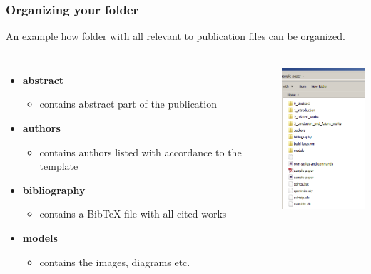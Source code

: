 \begin{frame}  \frametitle{Organizing your folder}
	
	An example how folder with all relevant to publication files can be organized.
	
	\begin{columns}
		\begin{itemize}
			\item \textbf{abstract}
				\begin{itemize}
					\item contains abstract part of the publication
				\end{itemize}
			\item \textbf{authors}
				\begin{itemize}
					\item contains authors listed with accordance to the template
				\end{itemize}					
			\item \textbf{bibliography}
			\begin{itemize}
				\item contains a BibTeX file with all cited works
			\end{itemize}					
			\item \textbf{models}
			\begin{itemize}					
				\item contains the images, diagrams etc.
			\end{itemize}					
		\end{itemize}

			\begin{center}
				\includegraphics[height=2.2in]{tips/images/sampleFolderStructure}
			\end{center}
	\end{columns}
		

	
\end{frame}

